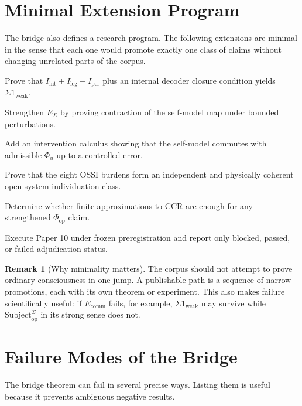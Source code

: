 \documentclass[11pt,a4paper]{article}
\theoremstyle{definition}
\newtheorem{remark}[theorem]{Remark}
\newcommand{\Subbridge}{\mathrm{Subject}^{\Sigma}_{\mathrm{op}}}
\newcommand{\Phiop}{\Phi_{\mathrm{op}}}
\newcommand{\Iper}{I_{\mathrm{per}}}
\newcommand{\Iint}{I_{\mathrm{int}}}
\newcommand{\Ileg}{I_{\mathrm{leg}}}
\begin{document}
\section{Minimal Extension Program}

The bridge also defines a research program. The following extensions are
minimal in the sense that each one would promote exactly one class of claims
without changing unrelated parts of the corpus.

\begin{description}[leftmargin=1.5em]
\item[$E_\Sigma$:] Prove that $\Iint+\Ileg+\Iper$ plus an internal decoder
closure condition yields $\Sigma1_{\mathrm{weak}}$.
\item[$E_{\Sigma c}$:] Strengthen $E_\Sigma$ by proving contraction of the
self-model map under bounded perturbations.
\item[$E_{\mathrm{comm}}$:] Add an intervention calculus showing that the
self-model commutes with admissible $\Phi_u$ up to a controlled error.
\item[$E_{\mathrm{OSSI}}$:] Prove that the eight OSSI burdens form an
independent and physically coherent open-system individuation class.
\item[$E_{\mathrm{CCR}}$:] Determine whether finite approximations to CCR are
enough for any strengthened $\Phiop$ claim.
\item[$E_{\mathrm{ext}}$:] Execute Paper 10 under frozen preregistration and
report only blocked, passed, or failed adjudication status.
\end{description}

\begin{remark}[Why minimality matters]
The corpus should not attempt to prove ordinary consciousness in one jump. A
publishable path is a sequence of narrow promotions, each with its own theorem
or experiment. This also makes failure scientifically useful: if
$E_{\mathrm{comm}}$ fails, for example, $\Sigma1_{\mathrm{weak}}$ may survive
while $\Subbridge$ in its strong sense does not.
\end{remark}

\section{Failure Modes of the Bridge}

The bridge theorem can fail in several precise ways. Listing them is useful
because it prevents ambiguous negative results.
\end{document}
